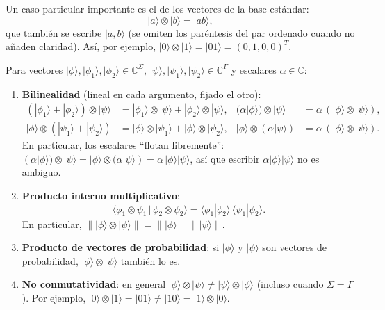 \documentclass[11pt, a4paper, twoside, openright]{report}
\begin{document}
\noindent Un caso particular importante es el de los vectores de la base estándar:
\[ |a\rangle \otimes |b\rangle = |ab\rangle, \]
que también se escribe $|a, b\rangle$ (se omiten los paréntesis del par ordenado cuando no añaden claridad). Así, por ejemplo, $|0\rangle \otimes |1\rangle = |01\rangle = (0, 1, 0, 0)^T$.

\begin{tcolorbox}[colback=teal!5!white,colframe=teal!75!black,title=\textbf{Proposición: Propiedades del producto tensorial de vectores}]
Para vectores $|\phi\rangle, |\phi_1\rangle, |\phi_2\rangle \in \mathbb{C}^\Sigma$, $|\psi\rangle, |\psi_1\rangle, |\psi_2\rangle \in \mathbb{C}^\Gamma$ y escalares $\alpha \in \mathbb{C}$:
\begin{enumerate}
    \item \textbf{Bilinealidad} (lineal en cada argumento, fijado el otro):
    \begin{align*}
    (|\phi_1\rangle + |\phi_2\rangle) \otimes |\psi\rangle &= |\phi_1\rangle \otimes |\psi\rangle + |\phi_2\rangle \otimes |\psi\rangle, &
    (\alpha|\phi\rangle) \otimes |\psi\rangle &= \alpha\,(|\phi\rangle \otimes |\psi\rangle), \\
    |\phi\rangle \otimes (|\psi_1\rangle + |\psi_2\rangle) &= |\phi\rangle \otimes |\psi_1\rangle + |\phi\rangle \otimes |\psi_2\rangle, &
    |\phi\rangle \otimes (\alpha|\psi\rangle) &= \alpha\,(|\phi\rangle \otimes |\psi\rangle).
    \end{align*}
    En particular, los escalares ``flotan libremente'': $(\alpha|\phi\rangle)\otimes|\psi\rangle = |\phi\rangle \otimes (\alpha|\psi\rangle) = \alpha\,|\phi\rangle|\psi\rangle$, así que escribir $\alpha|\phi\rangle|\psi\rangle$ no es ambiguo.
    \item \textbf{Producto interno multiplicativo}:
    \[ \big\langle \phi_1 \otimes \psi_1 \,\big|\, \phi_2 \otimes \psi_2 \big\rangle = \langle \phi_1|\phi_2\rangle\,\langle\psi_1|\psi_2\rangle. \]
    En particular, $\big\| |\phi\rangle \otimes |\psi\rangle \big\| = \big\||\phi\rangle\big\|\,\big\||\psi\rangle\big\|$.
    \item \textbf{Producto de vectores de probabilidad}: si $|\phi\rangle$ y $|\psi\rangle$ son vectores de probabilidad, $|\phi\rangle\otimes|\psi\rangle$ también lo es.
    \item \textbf{No conmutatividad}: en general $|\phi\rangle \otimes |\psi\rangle \neq |\psi\rangle \otimes |\phi\rangle$ (incluso cuando $\Sigma = \Gamma$). Por ejemplo, $|0\rangle\otimes|1\rangle = |01\rangle \neq |10\rangle = |1\rangle\otimes|0\rangle$.
\end{enumerate}
\end{tcolorbox}
\end{document}
